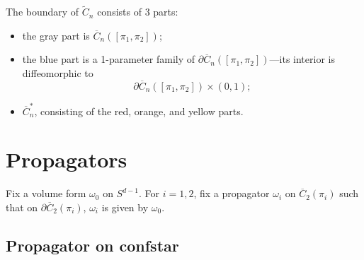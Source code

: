 \documentclass[11pt]{article}
\theoremstyle{definition}
\theoremstyle{remark}
\def\wt#1{\widetilde{#1}}
\def\ov#1{\overline{#1}}
\begin{document}
The boundary of $\wt{C}_n$ consists of 3 parts: 
\begin{itemize}
\item the gray part is $\ov{C}_n([\pi_1,\pi_2])$;
\item the blue part is a 1-parameter family of $\partial \ov{C}_n([\pi_1,\pi_2])$---its interior is diffeomorphic to 
$$\partial \ov{C}_n([\pi_1,\pi_2])\times (0,1);$$
\item $\ov{C}^*_n$, consisting of the red, orange, and yellow parts. 
\end{itemize}

\section{Propagators}

Fix a volume form $\omega_0$ on $S^{d-1}$. 
For $i=1,2$, fix a propagator $\omega_i$ on $\ov{C}_2(\pi_i)$ such that on $\partial\ov{C}_2(\pi_i)$, $\omega_i$ is given by $\omega_0$. 

\subsection{Propagator on confstar}
\end{document}
